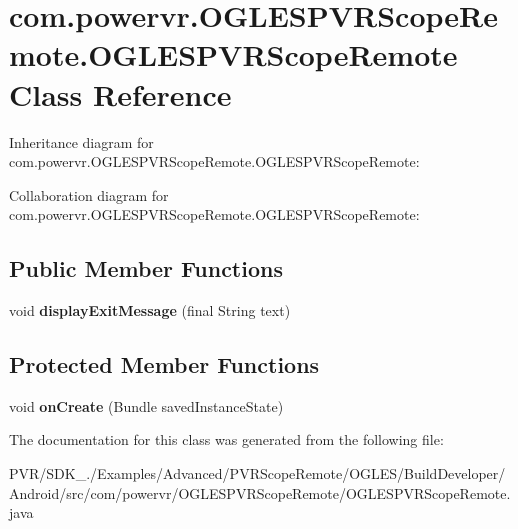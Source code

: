 \hypertarget{classcom_1_1powervr_1_1_o_g_l_e_s_p_v_r_scope_remote_1_1_o_g_l_e_s_p_v_r_scope_remote}{\section{com.\+powervr.\+O\+G\+L\+E\+S\+P\+V\+R\+Scope\+Remote.\+O\+G\+L\+E\+S\+P\+V\+R\+Scope\+Remote Class Reference}
\label{classcom_1_1powervr_1_1_o_g_l_e_s_p_v_r_scope_remote_1_1_o_g_l_e_s_p_v_r_scope_remote}
}


Inheritance diagram for com.\+powervr.\+O\+G\+L\+E\+S\+P\+V\+R\+Scope\+Remote.\+O\+G\+L\+E\+S\+P\+V\+R\+Scope\+Remote\+:


Collaboration diagram for com.\+powervr.\+O\+G\+L\+E\+S\+P\+V\+R\+Scope\+Remote.\+O\+G\+L\+E\+S\+P\+V\+R\+Scope\+Remote\+:
\subsection*{Public Member Functions}
\begin{DoxyCompactItemize}
\item 
\hypertarget{classcom_1_1powervr_1_1_o_g_l_e_s_p_v_r_scope_remote_1_1_o_g_l_e_s_p_v_r_scope_remote_ab999d1efe08b20b799e17e3df163df55}{void {\bfseries display\+Exit\+Message} (final String text)}\label{classcom_1_1powervr_1_1_o_g_l_e_s_p_v_r_scope_remote_1_1_o_g_l_e_s_p_v_r_scope_remote_ab999d1efe08b20b799e17e3df163df55}

\end{DoxyCompactItemize}
\subsection*{Protected Member Functions}
\begin{DoxyCompactItemize}
\item 
\hypertarget{classcom_1_1powervr_1_1_o_g_l_e_s_p_v_r_scope_remote_1_1_o_g_l_e_s_p_v_r_scope_remote_a9e49f900e6aec7f4be6dd88a4bb5a40a}{void {\bfseries on\+Create} (Bundle saved\+Instance\+State)}\label{classcom_1_1powervr_1_1_o_g_l_e_s_p_v_r_scope_remote_1_1_o_g_l_e_s_p_v_r_scope_remote_a9e49f900e6aec7f4be6dd88a4bb5a40a}

\end{DoxyCompactItemize}


The documentation for this class was generated from the following file\+:\begin{DoxyCompactItemize}
\item 
P\+V\+R/\+S\+D\+K\+\_./\+Examples/\+Advanced/\+P\+V\+R\+Scope\+Remote/\+O\+G\+L\+E\+S/\+Build\+Developer/\+Android/src/com/powervr/\+O\+G\+L\+E\+S\+P\+V\+R\+Scope\+Remote/O\+G\+L\+E\+S\+P\+V\+R\+Scope\+Remote.\+java\end{DoxyCompactItemize}
